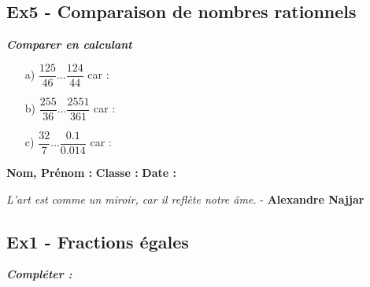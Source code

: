 \documentclass[11pt]{article}
\begin{document}
\subsection*{Ex5 - Comparaison de nombres rationnels}

\textit{\textbf{Comparer en calculant}}

\begin{enumerate}
  \item[a)] $ \dfrac{125}{46} \ldots \dfrac{124}{44} $  car : \dotfill
  \item[b)] $ \dfrac{255}{36} \ldots \dfrac{2551}{361} $  car : \dotfill
  \item[c)] $ \dfrac{32}{7} \ldots \dfrac{0.1}{0.014} $  car : \dotfill
\end{enumerate}

\newpage

\textbf{Nom, Prénom :} \hspace{8cm} \textbf{Classe :} \hspace{3cm} \textbf{Date :}\\

\begin{center}
  \textit{L'art est comme un miroir, car il reflète notre âme.}  - \textbf{Alexandre Najjar}
\end{center}

\subsection*{Ex1 - Fractions égales}

\textit{\textbf{Compléter :}}
\end{document}

